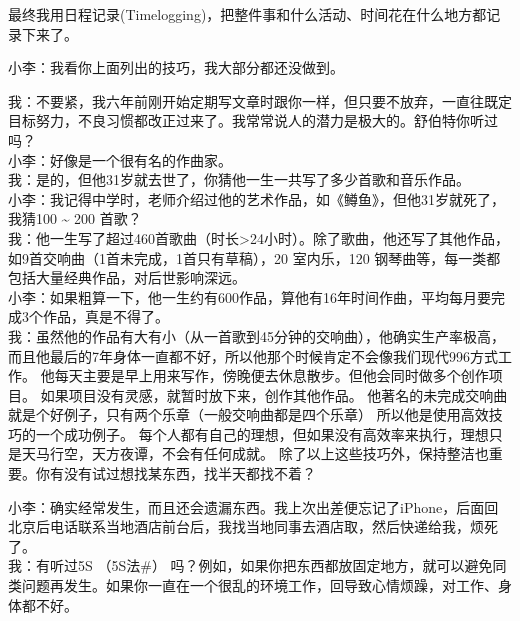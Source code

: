 
最终我用日程记录(Timelogging)，把整件事和什么活动、时间花在什么地方都记录下来了。

小李：我看你上面列出的技巧，我大部分都还没做到。

我：不要紧，我六年前刚开始定期写文章时跟你一样，但只要不放弃，一直往既定目标努力，不良习惯都改正过来了。我常常说人的潜力是极大的。舒伯特你听过吗？\\
小李：好像是一个很有名的作曲家。\\
我：是的，但他31岁就去世了，你猜他一生一共写了多少首歌和音乐作品。\\
小李：我记得中学时，老师介绍过他的艺术作品，如《鳟鱼》，但他31岁就死了，我猜100 \textasciitilde{} 200 首歌？\\
我：他一生写了超过460首歌曲（时长\textgreater{}24小时）。除了歌曲，他还写了其他作品，如9首交响曲（1首未完成，1首只有草稿），20
室内乐，120 钢琴曲等，每一类都包括大量经典作品，对后世影响深远。\\
小李：如果粗算一下，他一生约有600作品，算他有16年时间作曲，平均每月要完成3个作品，真是不得了。\\
我：虽然他的作品有大有小（从一首歌到45分钟的交响曲），他确实生产率极高，而且他最后的7年身体一直都不好，所以他那个时候肯定不会像我们现代996方式工作。
他每天主要是早上用来写作，傍晚便去休息散步。但他会同时做多个创作项目。
如果项目没有灵感，就暂时放下来，创作其他作品。
他著名的未完成交响曲就是个好例子，只有两个乐章（一般交响曲都是四个乐章）
所以他是使用高效技巧的一个成功例子。
每个人都有自己的理想，但如果没有高效率来执行，理想只是天马行空，天方夜谭，不会有任何成就。
除了以上这些技巧外，保持整洁也重要。你有没有试过想找某东西，找半天都找不着？

小李：确实经常发生，而且还会遗漏东西。我上次出差便忘记了iPhone，后面回北京后电话联系当地酒店前台后，我找当地同事去酒店取，然后快递给我，烦死了。\\
我：有听过5S （5S法\#）
吗？例如，如果你把东西都放固定地方，就可以避免同类问题再发生。如果你一直在一个很乱的环境工作，回导致心情烦躁，对工作、身体都不好。

\begin{description}
\item[]
\end{description}


